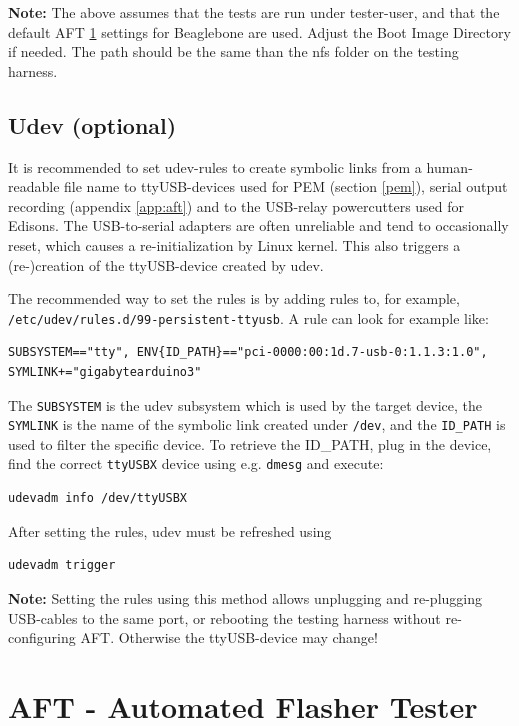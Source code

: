 \documentclass[a4paper,11pt]{article}
\newcommand{\note}{\textbf{Note: }}
\newcommand{\cmd}[1]{\texttt{#1}}
\begin{document}
\note The above assumes that the tests are run under tester-user, and that the default AFT \ref{aft} settings for Beaglebone are used. Adjust the Boot Image Directory if needed. The path should be the same than the nfs folder on the testing harness.

\subsection*{Udev (optional)}
It is recommended to set udev-rules to create symbolic links from a human-readable file name to ttyUSB-devices used for PEM (section \ref{pem}), serial output recording (appendix \ref{app:aft}) and to the USB-relay powercutters used for Edisons. The USB-to-serial adapters are often unreliable and tend to occasionally reset, which causes a re-initialization by Linux kernel. This also triggers a (re-)creation of the ttyUSB-device created by udev.

The recommended way to set the rules is by adding rules to, for example, \\ \cmd{/etc/udev/rules.d/99-persistent-ttyusb}. A rule can look for example like:
\begin{lstlisting}
SUBSYSTEM=="tty", ENV{ID_PATH}=="pci-0000:00:1d.7-usb-0:1.1.3:1.0", SYMLINK+="gigabytearduino3"
\end{lstlisting}
The \cmd{SUBSYSTEM} is the udev subsystem which is used by the target device, the \cmd{SYMLINK} is the name of the symbolic link created under \cmd{/dev}, and the \cmd{ID\_PATH} is used to filter the specific device. To retrieve the {ID\_PATH}, plug in the device, find the correct \cmd{ttyUSBX} device using e.g. \cmd{dmesg} and execute:
\begin{lstlisting}
udevadm info /dev/ttyUSBX
\end{lstlisting}

After setting the rules, udev must be refreshed using
\begin{lstlisting}
udevadm trigger
\end{lstlisting}

\note Setting the rules using this method allows unplugging and re-plugging USB-cables to the same port, or rebooting the testing harness without re-configuring AFT. Otherwise the ttyUSB-device may change!

\pagebreak

\section{AFT - Automated Flasher Tester}
\label{aft}
\end{document}
